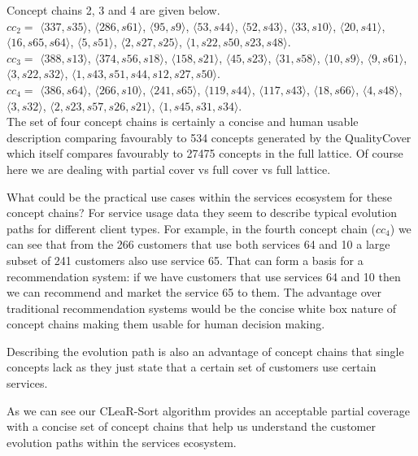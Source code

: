 \documentclass[acmconf,authordraft]{acmart}
\begin{document}
Concept chains 2, 3 and 4 are given below.
\\
$cc_2 = $
$\langle 337, {s35} \rangle$,
$\langle 286, {s61} \rangle$,
$\langle 95, {s9} \rangle$,
$\langle 53, {s44} \rangle$,
$\langle 52, {s43} \rangle$,
$\langle 33, {s10} \rangle$,
$\langle 20, {s41} \rangle$,
$\langle 16, {s65, s64} \rangle$,
$\langle 5, {s51} \rangle$,
$\langle 2, {s27, s25} \rangle$,
$\langle 1, {s22, s50, s23, s48} \rangle$.
\\
$cc_3 = $
$\langle 388, {s13} \rangle$,
$\langle 374, {s56, s18} \rangle$,
$\langle 158, {s21} \rangle$,
$\langle 45, {s23} \rangle$,
$\langle 31, {s58} \rangle$,
$\langle 10, {s9} \rangle$,
$\langle 9, {s61} \rangle$,
$\langle 3, {s22, s32} \rangle$,
$\langle 1, {s43, s51, s44, s12, s27, s50} \rangle$.
\\
$cc_4 = $
$\langle 386, {s64} \rangle$,
$\langle 266, {s10} \rangle$,
$\langle 241, {s65} \rangle$,
$\langle 119, {s44} \rangle$,
$\langle 117, {s43} \rangle$,
$\langle 18, {s66} \rangle$,
$\langle 4, {s48} \rangle$,
$\langle 3, {s32} \rangle$,
$\langle 2, {s23, s57, s26, s21} \rangle$,
$\langle 1, {s45, s31, s34} \rangle$.
\\
The set of four concept chains is certainly a concise and human usable description comparing favourably to 534 concepts generated by the QualityCover which itself compares favourably to 27475 concepts in the full lattice. Of course here we are dealing with partial cover vs full cover vs full lattice.

What could be the practical use cases within the services ecosystem for these concept chains? For service usage data they seem to describe typical evolution paths for different client types. For example, in the fourth concept chain ($cc_4$) we can see that from the 266 customers that use both services 64 and 10 a large subset of 241 customers also use service 65. That can form a basis for a recommendation system: if we have customers that use services 64 and 10 then we can recommend and market the service 65 to them. The advantage over traditional recommendation systems would be the concise white box nature of concept chains making them usable for human decision making.

Describing the evolution path is also an advantage of concept chains that single concepts lack as they just state that a certain set of customers use certain services. 

As we can see our CLeaR-Sort algorithm provides an acceptable partial coverage with a concise set of concept chains that help us understand the customer evolution paths within the services ecosystem.
\end{document}
